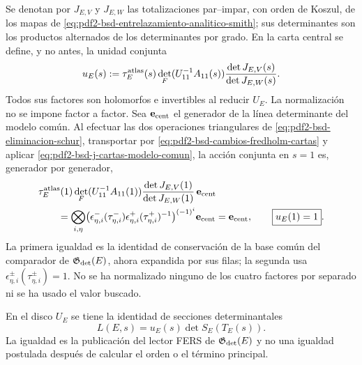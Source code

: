 Se denotan por $J_{E,V}$ y $J_{E,W}$ las totalizaciones par--impar, con
orden de Koszul, de los mapas de
\eqref{eq:pdf2-bsd-entrelazamiento-analitico-smith}; sus determinantes son
los productos alternados de los determinantes por grado. En la carta central
se define, y no antes, la unidad conjunta
\begin{equation}\label{eq:pdf2-bsd-u-e-construida}
 u_E(s):=\tau_E^{\rm atlas}(s)
 \det_F(U_{11}^{-1}A_{11}(s))
 \frac{\det J_{E,V}(s)}
      {\det J_{E,W}(s)}.
\end{equation}
Todos sus factores son holomorfos e invertibles al reducir $U_E$. La
normalización no se impone factor a factor. Sea $\mathbf e_{\rm cent}$ el
generador de la línea determinante del modelo común. Al efectuar las dos
operaciones triangulares de \eqref{eq:pdf2-bsd-eliminacion-schur}, transportar
por \eqref{eq:pdf2-bsd-cambios-fredholm-cartas} y aplicar
\eqref{eq:pdf2-bsd-j-cartas-modelo-comun}, la acción conjunta en $s=1$ es,
generador por generador,
\begin{equation}\label{eq:pdf2-bsd-u-e-normalizacion-probada}
 \begin{aligned}
 &\tau_E^{\rm atlas}(1)
 \det_F(U_{11}^{-1}A_{11}(1))
 \frac{\det J_{E,V}(1)}
      {\det J_{E,W}(1)}\,\mathbf e_{\rm cent}\\
 &\qquad=
 \bigotimes_{i,\eta}
 \bigl(\epsilon_{\eta,i}^-(\tau_{\eta,i}^-)
       \epsilon_{\eta,i}^+(\tau_{\eta,i}^+)^{-1}\bigr)^{(-1)^i}
 \mathbf e_{\rm cent}
 =\mathbf e_{\rm cent},
 \qquad \boxed{u_E(1)=1}.
 \end{aligned}
\end{equation}
La primera igualdad es la identidad de conservación de la base común del
comparador de $\mathfrak G_{\rm det}(E)$, ahora expandida por sus filas; la
segunda usa
$\epsilon_{\eta,i}^\pm(\tau_{\eta,i}^\pm)=1$. No se ha normalizado ninguno
de los cuatro factores por separado ni se ha usado el valor buscado.

\begin{proposition}
\label{prop:pdf2-bsd-fers-factorizacion-owner}
En el disco $U_E$ se tiene la identidad de secciones determinantales
\begin{equation}\label{eq:pdf2-bsd-factorizacion-analitica}
 \boxed{L(E,s)=u_E(s)\det S_E(T_E(s)).}
\end{equation}
La igualdad es la publicación del lector FERS de
$\mathfrak G_{\rm det}(E)$ y no una igualdad postulada después de
calcular el orden o el término principal.
\end{proposition}

